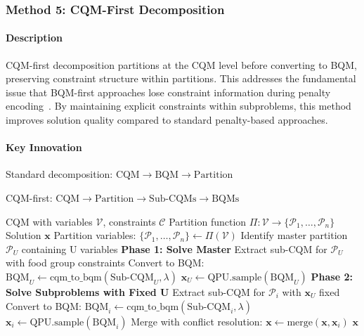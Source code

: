 \documentclass{oqireport}
\begin{document}
\subsubsection{Method 5: CQM-First Decomposition}

\paragraph{Description}
CQM-first decomposition partitions at the CQM level before converting to BQM, preserving constraint structure within partitions. This addresses the fundamental issue that BQM-first approaches lose constraint information during penalty encoding~\cite{lucas2014ising}. By maintaining explicit constraints within subproblems, this method improves solution quality compared to standard penalty-based approaches.

\paragraph{Key Innovation}

Standard decomposition: $\text{CQM} \rightarrow \text{BQM} \rightarrow \text{Partition}$

CQM-first: $\text{CQM} \rightarrow \text{Partition} \rightarrow \text{Sub-CQMs} \rightarrow \text{BQMs}$

\begin{algorithm}
\caption{CQM-First Decomposition with Constraint Preservation}
\begin{algorithmic}[1]
\Require CQM with variables $\mathcal{V}$, constraints $\mathcal{C}$
\Require Partition function $\Pi: \mathcal{V} \rightarrow \{\mathcal{P}_1, \ldots, \mathcal{P}_n\}$
\Ensure Solution $\mathbf{x}$
\State Partition variables: $\{\mathcal{P}_1, \ldots, \mathcal{P}_n\} \leftarrow \Pi(\mathcal{V})$
\State Identify master partition $\mathcal{P}_U$ containing U variables
\State \textbf{Phase 1: Solve Master}
\State Extract sub-CQM for $\mathcal{P}_U$ with food group constraints
\State Convert to BQM: $\text{BQM}_U \leftarrow \text{cqm\_to\_bqm}(\text{Sub-CQM}_U, \lambda)$
\State $\mathbf{x}_U \leftarrow \text{QPU.sample}(\text{BQM}_U)$
\State \textbf{Phase 2: Solve Subproblems with Fixed U}
    \State Extract sub-CQM for $\mathcal{P}_i$ with $\mathbf{x}_U$ fixed
    \State Convert to BQM: $\text{BQM}_i \leftarrow \text{cqm\_to\_bqm}(\text{Sub-CQM}_i, \lambda)$
    \State $\mathbf{x}_i \leftarrow \text{QPU.sample}(\text{BQM}_i)$
    \State Merge with conflict resolution: $\mathbf{x} \leftarrow \text{merge}(\mathbf{x}, \mathbf{x}_i)$
\EndFor
\State \Return $\mathbf{x}$
\end{algorithmic}
\end{algorithm}
\end{document}
